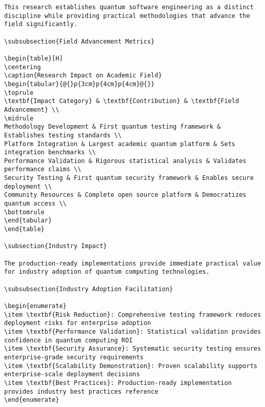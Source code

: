 \documentclass[12pt,a4paper]{report}
\begin{document}
\begin{lstlisting}
This research establishes quantum software engineering as a distinct discipline while providing practical methodologies that advance the field significantly.

\subsubsection{Field Advancement Metrics}

\begin{table}[H]
\centering
\caption{Research Impact on Academic Field}
\begin{tabular}{@{}p{3cm}p{4cm}p{4cm}@{}}
\toprule
\textbf{Impact Category} & \textbf{Contribution} & \textbf{Field Advancement} \\
\midrule
Methodology Development & First quantum testing framework & Establishes testing standards \\
Platform Integration & Largest academic quantum platform & Sets integration benchmarks \\
Performance Validation & Rigorous statistical analysis & Validates performance claims \\
Security Testing & First quantum security framework & Enables secure deployment \\
Community Resources & Complete open source platform & Democratizes quantum access \\
\bottomrule
\end{tabular}
\end{table}

\subsection{Industry Impact}

The production-ready implementations provide immediate practical value for industry adoption of quantum computing technologies.

\subsubsection{Industry Adoption Facilitation}

\begin{enumerate}
\item \textbf{Risk Reduction}: Comprehensive testing framework reduces deployment risks for enterprise adoption
\item \textbf{Performance Validation}: Statistical validation provides confidence in quantum computing ROI
\item \textbf{Security Assurance}: Systematic security testing ensures enterprise-grade security requirements
\item \textbf{Scalability Demonstration}: Proven scalability supports enterprise-scale deployment decisions
\item \textbf{Best Practices}: Production-ready implementation provides industry best practices reference
\end{enumerate}


\end{lstlisting}
\end{document}
